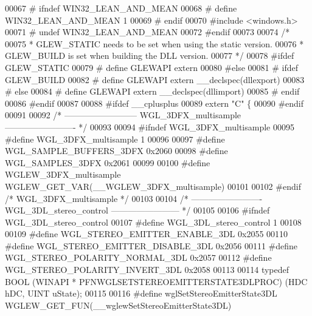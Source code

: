 \begin{DoxyCode}
00067 \textcolor{preprocessor}{#  ifndef WIN32\_LEAN\_AND\_MEAN}
00068 \textcolor{preprocessor}{#    define WIN32\_LEAN\_AND\_MEAN 1}
00069 \textcolor{preprocessor}{#  endif}
00070 \textcolor{preprocessor}{#include <windows.h>}
00071 \textcolor{preprocessor}{#  undef WIN32\_LEAN\_AND\_MEAN}
00072 \textcolor{preprocessor}{#endif}
00073 
00074 \textcolor{comment}{/*}
00075 \textcolor{comment}{ * GLEW\_STATIC needs to be set when using the static version.}
00076 \textcolor{comment}{ * GLEW\_BUILD is set when building the DLL version.}
00077 \textcolor{comment}{ */}
00078 \textcolor{preprocessor}{#ifdef GLEW\_STATIC}
00079 \textcolor{preprocessor}{#  define GLEWAPI extern}
00080 \textcolor{preprocessor}{#else}
00081 \textcolor{preprocessor}{#  ifdef GLEW\_BUILD}
00082 \textcolor{preprocessor}{#    define GLEWAPI extern \_\_declspec(dllexport)}
00083 \textcolor{preprocessor}{#  else}
00084 \textcolor{preprocessor}{#    define GLEWAPI extern \_\_declspec(dllimport)}
00085 \textcolor{preprocessor}{#  endif}
00086 \textcolor{preprocessor}{#endif}
00087 
00088 \textcolor{preprocessor}{#ifdef \_\_cplusplus}
00089 \textcolor{keyword}{extern} \textcolor{stringliteral}{"C"} \{
00090 \textcolor{preprocessor}{#endif}
00091 
00092 \textcolor{comment}{/* -------------------------- WGL\_3DFX\_multisample ------------------------- */}
00093 
00094 \textcolor{preprocessor}{#ifndef WGL\_3DFX\_multisample}
00095 \textcolor{preprocessor}{#define WGL\_3DFX\_multisample 1}
00096 
00097 \textcolor{preprocessor}{#define WGL\_SAMPLE\_BUFFERS\_3DFX 0x2060}
00098 \textcolor{preprocessor}{#define WGL\_SAMPLES\_3DFX 0x2061}
00099 
00100 \textcolor{preprocessor}{#define WGLEW\_3DFX\_multisample WGLEW\_GET\_VAR(\_\_WGLEW\_3DFX\_multisample)}
00101 
00102 \textcolor{preprocessor}{#endif }\textcolor{comment}{/* WGL\_3DFX\_multisample */}\textcolor{preprocessor}{}
00103 
00104 \textcolor{comment}{/* ------------------------- WGL\_3DL\_stereo\_control ------------------------ */}
00105 
00106 \textcolor{preprocessor}{#ifndef WGL\_3DL\_stereo\_control}
00107 \textcolor{preprocessor}{#define WGL\_3DL\_stereo\_control 1}
00108 
00109 \textcolor{preprocessor}{#define WGL\_STEREO\_EMITTER\_ENABLE\_3DL 0x2055}
00110 \textcolor{preprocessor}{#define WGL\_STEREO\_EMITTER\_DISABLE\_3DL 0x2056}
00111 \textcolor{preprocessor}{#define WGL\_STEREO\_POLARITY\_NORMAL\_3DL 0x2057}
00112 \textcolor{preprocessor}{#define WGL\_STEREO\_POLARITY\_INVERT\_3DL 0x2058}
00113 
00114 \textcolor{keyword}{typedef} BOOL (WINAPI * PFNWGLSETSTEREOEMITTERSTATE3DLPROC) (HDC hDC, UINT uState);
00115 
00116 \textcolor{preprocessor}{#define wglSetStereoEmitterState3DL WGLEW\_GET\_FUN(\_\_wglewSetStereoEmitterState3DL)}

\end{DoxyCode}

